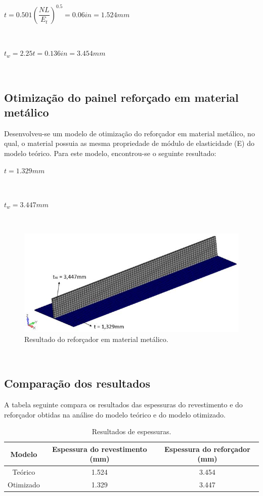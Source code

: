 \centerline{$t = 0.501({\dfrac{NL}{E_t}})^{0.5} = 0.06 in = 1.524 mm$}\

\centerline{$t_w = 2.25t = 0.136in = 3.454 mm$}\


\subsection{Otimização do painel reforçado em material metálico}
Desenvolveu-se um modelo de otimização do reforçador em material metálico, no qual, o material possuia as mesma propriedade de módulo de elasticidade (E) do modelo teórico. Para este modelo, encontrou-se o seguinte resultado:\

\centerline{$t = 1.329 mm$}\

\centerline{$t_w = 3.447 mm$}\

\begin{figure}[ht]
 \caption{\label{fig_ModelMetallic}Resultado do reforçador em material metálico.}
 \centering
 \includegraphics[scale=1.0]{figura/Model_Metallic1}
\end{figure}
\

\subsection{Comparação dos resultados}
A tabela seguinte compara os resultados das espessuras do revestimento e do reforçador obtidas na análise do modelo teórico e do modelo otimizado.
\begin{table}[h]
\centering
\begin{tabular}{ccc}
\toprule
Modelo & Espessura do revestimento (mm) & Espessura do reforçador (mm) \\\midrule
Teórico & 1.524 & 3.454\\
Otimizado & 1.329 & 3.447\\
\bottomrule
\end{tabular}
\caption{Resultados de espessuras.}
\label{tbl:result1_metalico}
\end{table}

